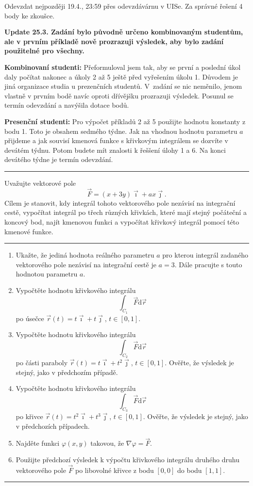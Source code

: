 \documentclass{article}
\begin{document}
{

  }


  Odevzdat nejpozději 19.4., 23:59 přes odevzdávárnu v UISe. Za správné řešení 4 body ke zkoušce.

  \textbf{Update 25.3. Zadání bylo původně určeno kombinovaným studentům, ale v prvním příkladě nově prozrazuji výsledek, aby bylo zadání použitelné  pro všechny.}

    \bigskip
  \textbf{Kombinovaní studenti:} Přeformuloval jsem tak, aby se první a poslední úkol daly počítat nakonec a úkoly 2 až 5 ještě před vyřešením úkolu 1. Důvodem je jiná organizace studia u prezenčních studentů. V~zadání se nic neměnilo, jenom vlastně v prvním bodě navíc oproti dřívějšku prozrazuji výsledek. Posunul se termín odevzdání a navýšila dotace bodů.

  \bigskip
  \textbf{Presenční studenti:} Pro výpočet příkladů 2 až 5 použijte hodnotu konstanty z bodu 1. Toto je obsahem sedmého týdne. Jak na vhodnou hodnotu parametru $a$ přijdeme a jak souvisí kmenová funkce s křivkovým integrálem se dozvíte v devátém týdnu. Potom budete mít znalosti k řeššení úlohy 1 a 6. Na konci devátého týdne je termín odevzdání.
  
  \bigskip
  \hrule
  
  \bigskip Uvažujte vektorové pole
  $$\vec F=(x+3y)\vec \imath + ax\vec\jmath.$$ Cílem je stanovit, kdy
  integrál tohoto vektorového pole nezávisí na integrační cestě,
  vypočítat integrál po třech různých křivkách, které mají stejný
  počáteční a koncový bod, najít kmenovou funkci a vypočítat křivkový
  integrál pomocí této kmenové funkce.  \bigskip \hrule
  
\begin{enumerate}[1)]
\item Ukažte, že jediná hodnota reálného parametru $a$ pro kterou integrál zadaného vektorového pole nezávisí na integrační cestě je $a=3$. Dále pracujte s touto hodnotou parametru $a$.
\item Vypočtěte hodnotu křivkového integrálu $$\int_{C_1} \vec F\mathrm d\vec r$$ po úsečce $\vec r(t)=t\vec \imath+t\vec \jmath$, $t\in[0,1]$.
\item Vypočtěte hodnotu křivkového integrálu $$\int_{C_2} \vec F\mathrm d\vec r$$ po části paraboly $\vec r(t)=t\vec \imath+t^2\vec \jmath$, $t\in[0,1]$. Ověřte, že výsledek je stejný, jako v předchozím případě.
\item Vypočtěte hodnotu křivkového integrálu $$\int_{C_3} \vec F\mathrm d\vec r$$ po křivce $\vec r(t)=t^2\vec \imath+t^3\vec \jmath$, $t\in[0,1]$. Ověřte, že výsledek je stejný, jako v předchozích případech.
\item Najděte funkci $\varphi(x,y)$ takovou, že $\nabla \varphi=\vec F.$
\item Použijte předchozí výsledek k výpočtu křivkového integrálu druhého druhu vektorového pole $\vec F$ po libovolné křivce z bodu $[0,0]$ do bodu $[1,1]$.
\end{enumerate}

\hrule
\bigskip
\end{document}
